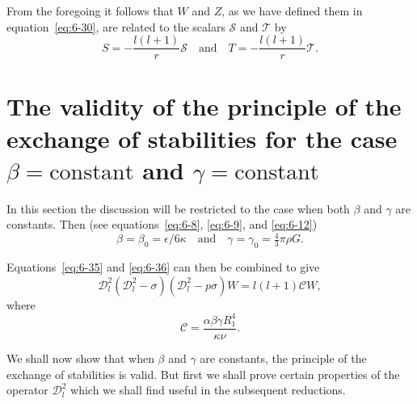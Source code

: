 From the foregoing it follows that $W$ and $Z$, as we have defined them
in equation~\eqref{eq:6-30}, are related to the scalars $\mathscr{S}$ and $\mathscr{T}$ by
\begin{equation}\label{eq:6-58}
S = -\frac{l(l+1)}{r}\mathscr{S} \quad\text{and}\quad T = -\frac{l(l+1)}{r}\mathscr{T}.
\end{equation}

\section{The validity of the principle of the exchange of stabilities
for the case $\beta = \text{constant}$ and $\gamma = \text{constant}$}\label{sec:57}
In this section the discussion will be restricted to the case when both
$\beta$ and $\gamma$ are constants. Then (see equations~\eqref{eq:6-8}, \eqref{eq:6-9}, and \eqref{eq:6-12})
\begin{equation}\label{eq:6-59}
\beta = \beta_0 = \epsilon/6\kappa \quad\text{and}\quad \gamma = \gamma_0 = \tfrac{4}{3}\pi\rho G.
\end{equation}

Equations~\eqref{eq:6-35} and \eqref{eq:6-36} can then be combined to give
\begin{equation}\label{eq:6-60}
\mathscr{D}_l^2(\mathscr{D}_l^2 - \sigma)(\mathscr{D}_l^2 - p\sigma)W = l(l+1)\mathcal{C} W,
\end{equation}
where
\begin{equation}\label{eq:6-61}
\mathcal{C} = \frac{\alpha\beta\gamma R_1^4}{\kappa\nu}.
\end{equation}

We shall now show that when $\beta$ and $\gamma$ are constants, the principle
of the exchange of stabilities is valid. But first we shall prove certain
properties of the operator $\mathscr{D}_l^2$ which we shall find useful in the subsequent
reductions.

